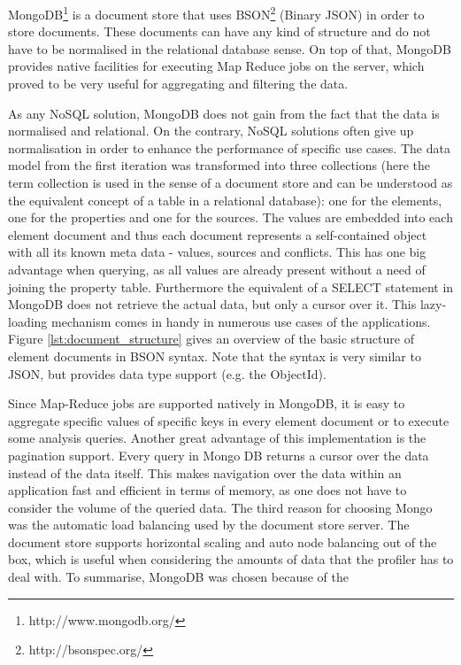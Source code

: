 MongoDB\footnote{http://www.mongodb.org/} is a document store that uses BSON\footnote{http://bsonspec.org/} (Binary JSON) in order to store documents. These documents can have any kind of structure and do not have to be normalised in the relational database sense. On top of that, MongoDB provides native facilities for executing Map Reduce \cite{Dean:2008:MSD:1327452.1327492} jobs on the server, which proved to be very useful for aggregating and filtering the data. 

As any NoSQL solution, MongoDB does not gain from the fact that the data is normalised and relational. On the contrary, NoSQL solutions often give up normalisation in order to enhance the performance of specific use cases. The data model from the first iteration was transformed into three collections (here the term collection is used in the sense of a document store and can be understood as the equivalent concept of a table in a relational database): one for the elements, one for the properties and one for the sources. The values are embedded into each element document and thus each document represents a self-contained object with all its known meta data - values, sources and conflicts. This has one big advantage when querying, as all values are already present without a need of joining the property table. Furthermore the equivalent of a SELECT statement in MongoDB does not retrieve the actual data, but only a cursor over it. This lazy-loading mechanism comes in handy in numerous use cases of the applications.
Figure \ref{lst:document_structure} gives an overview of the basic structure of element documents in BSON syntax. Note that the syntax is very similar to JSON, but provides data type support (e.g. the ObjectId).

Since Map-Reduce jobs are supported natively in MongoDB, it is easy to aggregate specific values of specific keys in every element document or to execute some analysis queries. Another great advantage of this implementation is the pagination support. Every query in Mongo DB returns a cursor over the data instead of the data itself. This makes navigation over the data within an application fast and efficient in terms of memory, as one does not have to consider the volume of the queried data.
The third reason for choosing Mongo was the automatic load balancing used by the document store server. The document store supports horizontal scaling and auto node balancing out of the box, which is useful when considering the amounts of data that the profiler has to deal with. To summarise, MongoDB was chosen because of the

